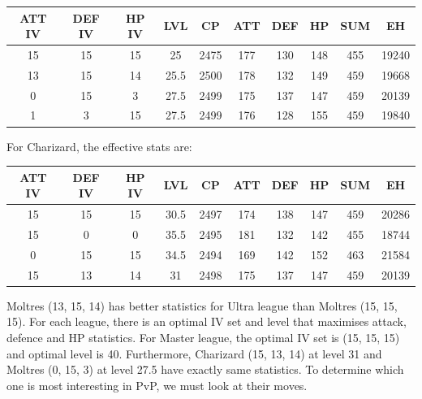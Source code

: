 \documentclass[12pt]{beamer}
\begin{document}
\begin{frame}
\begin{block}{}
\begin{footnotesize}
\begin{itemize}
 \begin{center}
 \begin{tabular}{cccccccccc}
 ATT IV & DEF IV & HP IV & LVL & CP & ATT & DEF & HP & SUM& EH \\ \hline
 15 & 15 & 15 & 25 & 2475 & 177 & 130 & 148 & 455 & 19240\\
13 & 15 & 14 & 25.5 & 2500 & 178 & 132 & 149 & 459 & 19668\\
0 & 15 & 3 & 27.5 & 2499 & 175 & 137 & 147 & 459 & 20139\\
1 & 3 & 15 & 27.5 & 2499 & 176 & 128 & 155 & 459 & 19840\\
\end{tabular}
 \end{center}
 
 For Charizard, the effective stats are:
 
 \begin{center}
 \begin{tabular}{cccccccccc}
 ATT IV & DEF IV & HP IV & LVL & CP & ATT & DEF & HP & SUM& EH \\ \hline
15 & 15 & 15 & 30.5 & 2497 & 174 & 138 & 147 & 459 & 20286 \\
15 & 0 & 0 & 35.5 & 2495 & 181 & 132 & 142 & 455 & 18744 \\
0 & 15 & 15 & 34.5 & 2494 & 169 & 142 & 152 & 463 & 21584 \\
15 & 13 & 14 & 31 & 2498 & 175 & 137 & 147 & 459 & 20139 \\
\end{tabular}
 \end{center}
 
Moltres (13, 15, 14) has better statistics for Ultra league than Moltres (15, 15, 15). For each league, there is an optimal IV set and level that maximises  attack, defence and HP statistics. For Master league, the optimal IV set is (15, 15, 15) and optimal level is 40. Furthermore, Charizard (15, 13, 14) at level 31 and Moltres (0, 15, 3) at level 27.5 have exactly same statistics. To determine which one is most interesting in PvP, we must look at their moves. 



\end{itemize}
\end{footnotesize}
\end{block}
\end{frame}
\end{document}
